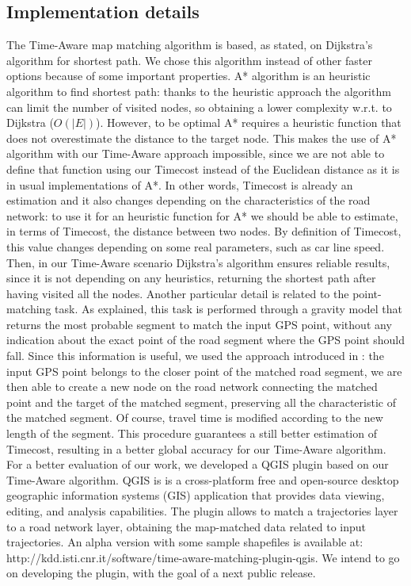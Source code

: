 \documentclass[5p]{elsarticle}
\begin{document}
\subsection{Implementation details}
The Time-Aware map matching algorithm is based, as stated, on Dijkstra's algorithm for shortest path. We chose this algorithm instead of other faster options because of some important properties. A* algorithm is an heuristic algorithm
to find shortest path: thanks to the heuristic approach the algorithm can limit the number of visited nodes, so obtaining a lower complexity w.r.t. to Dijkstra ($O(|E|)$). However, to be optimal A* requires a heuristic function that does not overestimate the distance to the target node. This makes
the use of A* algorithm with our Time-Aware approach impossible, since we are not able to define that function using our Timecost instead of the Euclidean distance as it is in usual implementations of A*. In other words, Timecost is already
an estimation and it also changes depending on the characteristics of the road network: to use it for an heuristic function for A* we should be able to estimate, in terms of Timecost, the distance between two nodes. 
By definition of Timecost, 
this value changes depending on some real parameters, such as car line speed. Then, in our Time-Aware scenario Dijkstra's algorithm ensures reliable results, since it is not 
depending on any heuristics, returning the shortest path after 
having visited all the nodes. Another particular detail is related to the point-matching task. As explained, this task is performed through a gravity model that returns the 
most probable segment to match the input GPS point, without any indication
about the exact point of the road segment where the GPS point should fall. Since this information is useful, we used the approach introduced in \cite{giovannini2011novel}: the 
input GPS point belongs to the closer point of the matched road
segment, we are then able to create a new node on the road network connecting the matched point and the target of the matched segment, preserving all the characteristic of the matched segment. 
Of course, travel time is modified according to the new length of the segment. This procedure guarantees a still better estimation of Timecost, resulting in a better global accuracy for our Time-Aware algorithm. \\
For a better evaluation of our work, we developed a QGIS plugin based on our Time-Aware algorithm. QGIS is  is a cross-platform free and open-source desktop geographic information systems (GIS) application 
that provides data viewing, editing, and analysis capabilities. The plugin allows to match a trajectories layer to a road network layer, obtaining the map-matched
data related to input trajectories. An alpha version with some sample shapefiles is available at: http://kdd.isti.cnr.it/software/time-aware-matching-plugin-qgis. We intend to go on developing the plugin, with the goal
of a next public release.  
\end{document}
